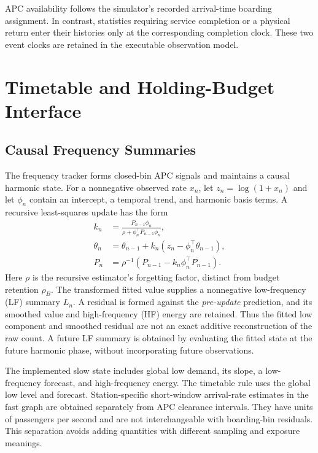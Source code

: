 APC availability follows the simulator's recorded arrival-time boarding assignment. In contrast, statistics requiring service completion or a physical return enter their histories only at the corresponding completion clock. These two event clocks are retained in the executable observation model.

\section{Timetable and Holding-Budget Interface}
\label{sec:method}

\subsection{Causal Frequency Summaries}
The frequency tracker forms closed-bin APC signals and maintains a causal harmonic state. For a nonnegative observed rate $x_n$, let $z_n=\log(1+x_n)$ and let $\phi_n$ contain an intercept, a temporal trend, and harmonic basis terms. A recursive least-squares update has the form
\begin{align}
 k_n&=\frac{P_{n-1}\phi_n}{\rho+\phi_n^\top P_{n-1}\phi_n},\\
 \theta_n&=\theta_{n-1}+k_n(z_n-\phi_n^\top\theta_{n-1}),\\
 P_n&=\rho^{-1}(P_{n-1}-k_n\phi_n^\top P_{n-1}).
\end{align}
Here $\rho$ is the recursive estimator's forgetting factor, distinct from budget retention $\rho_B$. The transformed fitted value supplies a nonnegative low-frequency (LF) summary $L_n$. A residual is formed against the \emph{pre-update} prediction, and its smoothed value and high-frequency (HF) energy are retained. Thus the fitted low component and smoothed residual are not an exact additive reconstruction of the raw count. A future LF summary is obtained by evaluating the fitted state at the future harmonic phase, without incorporating future observations.

The implemented slow state includes global low demand, its slope, a low-frequency forecast, and high-frequency energy. The timetable rule uses the global low level and forecast. Station-specific short-window arrival-rate estimates in the fast graph are obtained separately from APC clearance intervals. They have units of passengers per second and are not interchangeable with boarding-bin residuals. This separation avoids adding quantities with different sampling and exposure meanings.

